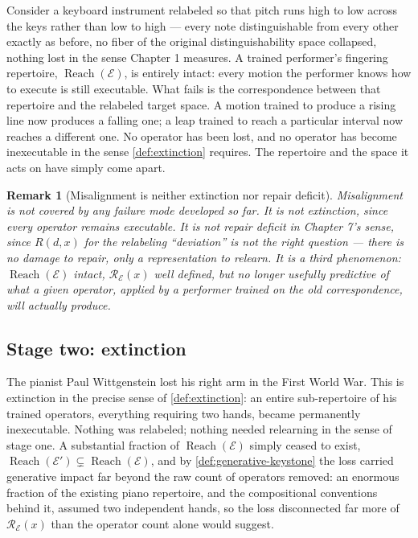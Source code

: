 \documentclass[12pt]{report}
\newtheorem{remark}[definition]{Remark}
\newcommand{\Reach}{\ensuremath{\operatorname{Reach}}}
\begin{document}
Consider a keyboard instrument relabeled so that pitch runs high to low
across the keys rather than low to high --- every note distinguishable
from every other exactly as before, no fiber of the original
distinguishability space collapsed, nothing lost in the sense Chapter 1
measures. A trained performer's fingering repertoire, $\Reach(\mathcal{E})$,
is entirely intact: every motion the performer knows how to execute is
still executable. What fails is the correspondence between that
repertoire and the relabeled target space. A motion trained to produce
a rising line now produces a falling one; a leap trained to reach a
particular interval now reaches a different one. No operator has been
lost, and no operator has become inexecutable in the sense
\cref{def:extinction} requires. The repertoire and the space it acts on
have simply come apart.

\begin{remark}[Misalignment is neither extinction nor repair deficit]
\label{rem:misalignment}
Misalignment is not covered by any failure mode developed so far. It is
not extinction, since every operator remains executable. It is not
repair deficit in Chapter 7's sense, since $R(d,x)$ for the relabeling
``deviation'' is not the right question --- there is no damage to
repair, only a representation to relearn. It is a third phenomenon:
$\Reach(\mathcal{E})$ intact, $\mathcal{R}_\mathcal{E}(x)$ well defined,
but no longer usefully predictive of what a given operator, applied by
a performer trained on the old correspondence, will actually produce.
\end{remark}

\subsection*{Stage two: extinction}

The pianist Paul Wittgenstein lost his right arm in the First World
War. This is extinction in the precise sense of \cref{def:extinction}:
an entire sub-repertoire of his trained operators, everything requiring
two hands, became permanently inexecutable. Nothing was relabeled;
nothing needed relearning in the sense of stage one. A substantial
fraction of $\Reach(\mathcal{E})$ simply ceased to exist,
$\Reach(\mathcal{E}') \subsetneq \Reach(\mathcal{E})$, and by
\cref{def:generative-keystone} the loss carried generative impact far
beyond the raw count of operators removed: an enormous fraction of the
existing piano repertoire, and the compositional conventions behind it,
assumed two independent hands, so the loss disconnected far more of
$\mathcal{R}_\mathcal{E}(x)$ than the operator count alone would
suggest.
\end{document}
